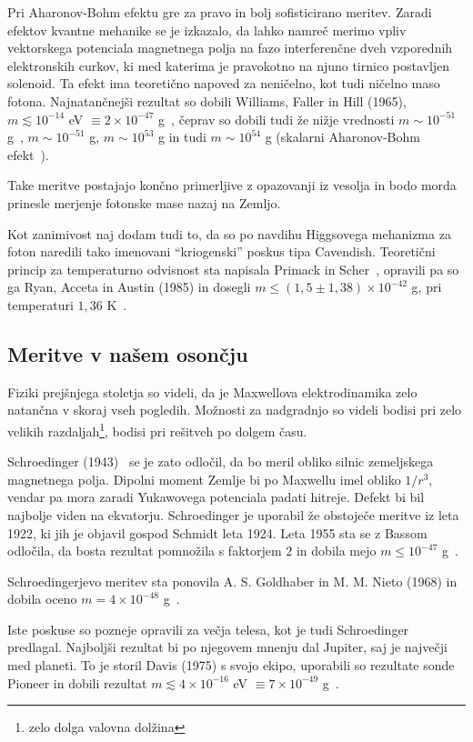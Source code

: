 \documentclass[a4paper, twocolumn, titlepage]{article}
\begin{document}
Pri Aharonov-Bohm efektu gre za pravo in bolj sofisticirano meritev. Zaradi efektov kvantne mehanike se je izkazalo, da
lahko namreč merimo vpliv vektorskega potenciala magnetnega polja na fazo interferenčne dveh vzporednih elektronskih curkov,
ki med katerima je pravokotno na njuno tirnico postavljen solenoid. Ta efekt ima teoretično napoved za neničelno, kot tudi
ničelno maso fotona. Najnatančnejši rezultat so dobili Williams, Faller in Hill (1965), $m \lesssim 10^{-14}$ eV $\equiv
2\times 10^{-47}$ g~\cite{nieto2}, čeprav so dobili tudi že nižje vrednosti $m \sim 10^{-51}$ g~\cite{over},
$m \sim 10^{-51}$ g, $m \sim 10^{53}$ g in tudi $m \sim 10^{54}$ g (skalarni Aharonov-Bohm efekt~\cite{over}).

Take meritve postajajo končno primerljive z opazovanji iz vesolja in bodo morda prinesle merjenje fotonske mase nazaj na
Zemljo.

Kot zanimivost naj dodam tudi to, da so po navdihu Higgsovega mehanizma za foton naredili tako imenovani "`kriogenski"'
poskus tipa Cavendish. Teoretični princip za temperaturno odvisnost sta napisala Primack in Scher~\cite{nieto2},
opravili pa so ga Ryan, Acceta in Austin (1985) in dosegli $m \leq (1,5 \pm 1,38) \times 10^{-42}$ g, pri temperaturi
$1,36$ K~\cite{over}.

\subsection{Meritve v našem osončju}

Fiziki prejšnjega stoletja so videli, da je Maxwellova elektrodinamika zelo natančna v skoraj vseh pogledih. Možnosti za
nadgradnjo so videli bodisi pri zelo velikih razdaljah\footnote{zelo dolga valovna dolžina}, bodisi pri rešitveh po dolgem
času.

Schroedinger (1943)~\cite{nieto1} se je zato odločil, da bo meril obliko silnic zemeljskega magnetnega polja. Dipolni moment
Zemlje bi po Maxwellu imel obliko $1/r^3$, vendar pa mora zaradi Yukawovega potenciala padati hitreje. Defekt bi bil najbolje
viden na ekvatorju. Schroedinger je uporabil že obstoječe meritve iz leta 1922, ki jih je objavil gospod Schmidt leta 1924.
Leta 1955 sta se z Bassom odločila, da bosta rezultat pomnožila s faktorjem $2$ in dobila mejo $m \leq 10^{-47}$
g~\cite{nieto1}.

Schroedingerjevo meritev sta ponovila A. S. Goldhaber in M. M. Nieto (1968) in dobila oceno $m = 4 \times 10^{-48}$
g~\cite{nieto1, over}.

Iste poskuse so pozneje opravili za večja telesa, kot je tudi Schroedinger predlagal. Najboljši rezultat bi po njegovem
mnenju dal Jupiter, saj je največji med planeti. To je storil Davis (1975) s svojo ekipo, uporabili so rezultate sonde
Pioneer in dobili rezultat $m \lesssim 4\times10^{-16}$ eV $\equiv 7 \times 10^{-49}$ g~\cite{nieto2,over}.
\end{document}
